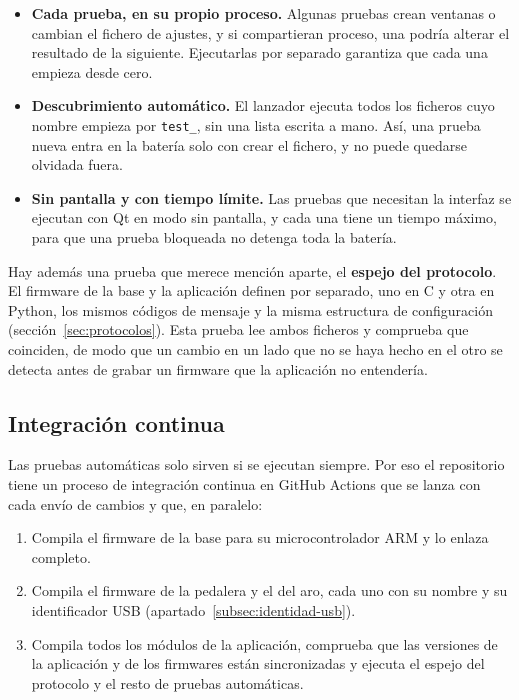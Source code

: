 \begin{itemize}
	\item \textbf{Cada prueba, en su propio proceso.} Algunas pruebas crean ventanas o cambian el fichero de ajustes, y si compartieran proceso, una podría alterar el resultado de la siguiente. Ejecutarlas por separado garantiza que cada una empieza desde cero.
	\item \textbf{Descubrimiento automático.} El lanzador ejecuta todos los ficheros cuyo nombre empieza por \texttt{test\_}, sin una lista escrita a mano. Así, una prueba nueva entra en la batería solo con crear el fichero, y no puede quedarse olvidada fuera.
	\item \textbf{Sin pantalla y con tiempo límite.} Las pruebas que necesitan la interfaz se ejecutan con Qt en modo sin pantalla, y cada una tiene un tiempo máximo, para que una prueba bloqueada no detenga toda la batería.
\end{itemize}

Hay además una prueba que merece mención aparte, el \textbf{espejo del protocolo}. El firmware de la base y la aplicación definen por separado, uno en C y otra en Python, los mismos códigos de mensaje y la misma estructura de configuración (sección~\ref{sec:protocolos}). Esta prueba lee ambos ficheros y comprueba que coinciden, de modo que un cambio en un lado que no se haya hecho en el otro se detecta antes de grabar un firmware que la aplicación no entendería.

\subsection{Integración continua}
\label{subsec:pruebas-ci}
Las pruebas automáticas solo sirven si se ejecutan siempre. Por eso el repositorio tiene un proceso de integración continua en GitHub Actions que se lanza con cada envío de cambios y que, en paralelo:

\begin{enumerate}
	\item Compila el firmware de la base para su microcontrolador ARM y lo enlaza completo.
	\item Compila el firmware de la pedalera y el del aro, cada uno con su nombre y su identificador USB (apartado~\ref{subsec:identidad-usb}).
	\item Compila todos los módulos de la aplicación, comprueba que las versiones de la aplicación y de los firmwares están sincronizadas y ejecuta el espejo del protocolo y el resto de pruebas automáticas.
\end{enumerate}

